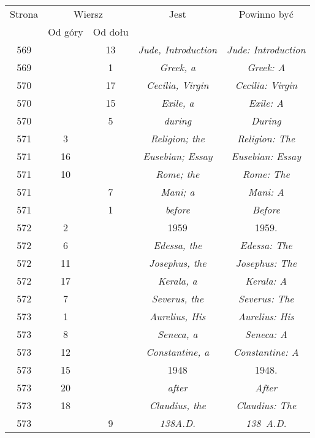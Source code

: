 \documentclass[a4paper,11pt]{article}
\begin{document}
\begin{center}
  \begin{tabular}{|c|c|c|c|c|}
    \hline
    Strona & \multicolumn{2}{c|}{Wiersz} & Jest
    & Powinno być \\ \cline{2-3}
    & Od góry & Od dołu & & \\
    \hline
    569 & & 13 & \textit{Jude, Introduction}
    & \textit{Jude: Introduction} \\
    569 & & \hphantom{0}1 & \textit{Greek, a} & \textit{Greek: A} \\
    570 & & 17 & \textit{Cecilia, Virgin} & \textit{Cecilia: Virgin} \\
    570 & & 15 & \textit{Exile, a} & \textit{Exile: A} \\
    570 & & \hphantom{0}5 & \textit{during} & \textit{During} \\
    571 & \hphantom{0}3 & & \textit{Religion; the}
    & \textit{Religion: The} \\
    571 & 16 & & \textit{Eusebian; Essay} & \textit{Eusebian: Essay} \\
    571 & 10 & & \textit{Rome; the} & \textit{Rome: The} \\
    571 & & \hphantom{0}7 & \textit{Mani; a} & \textit{Mani: A} \\
    571 & & \hphantom{0}1 & \textit{before} & \textit{Before} \\
    572 & \hphantom{0}2 & & 1959 & 1959. \\
    572 & \hphantom{0}6 & & \textit{Edessa, the} & \textit{Edessa: The} \\
    572 & 11 & & \textit{Josephus, the} & \textit{Josephus: The} \\
    572 & 17 & & \textit{Kerala, a} & \textit{Kerala: A} \\
    572 & \hphantom{0}7 & & \textit{Severus, the} & \textit{Severus: The} \\
    573 & \hphantom{0}1 & & \textit{Aurelius, His}
    & \textit{Aurelius: His} \\
    573 & \hphantom{0}8 & & \textit{Seneca, a} & \textit{Seneca: A} \\
    573 & 12 & & \textit{Constantine, a} & \textit{Constantine: A} \\
    573 & 15 & & 1948 & 1948. \\
    573 & 20 & & \textit{after} & \textit{After} \\
    573 & 18 & & \textit{Claudius, the} & \textit{Claudius: The} \\
    573 & & \hphantom{0}9 & \textit{138A.D.} & \textit{138~A.D.} \\

\end{tabular}
\end{center}
\end{document}
